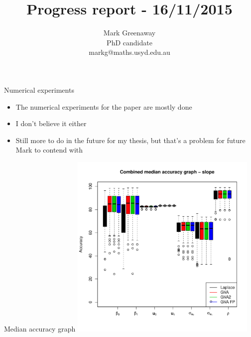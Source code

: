 \documentclass{beamer}
\title{Progress report - 16/11/2015}
\author{Mark Greenaway\\PhD candidate\\markg@maths.usyd.edu.au}
\begin{document}
\begin{frame}
	\maketitle
\end{frame}

\begin{frame}{Numerical experiments}
	\begin{itemize}
		\item The numerical experiments for the paper are mostly done
		\item I don't believe it either
		\item Still more to do in the future for my thesis, but that's a problem for future Mark to contend with
	\end{itemize}
\end{frame}

\begin{frame}{Median accuracy graph}
	\includegraphics[width=90mm, height=90mm]{code/results/median_accuracy_combined_slope.pdf}
\end{frame}
\end{document}
